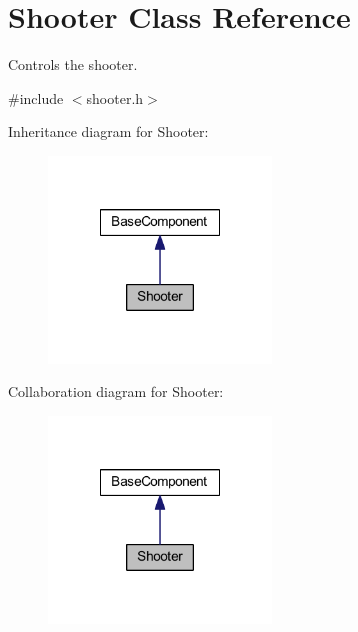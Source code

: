 \hypertarget{class_shooter}{\section{\-Shooter \-Class \-Reference}
\label{class_shooter}
}


\-Controls the shooter.  




{\ttfamily \#include $<$shooter.\-h$>$}



\-Inheritance diagram for \-Shooter\-:\nopagebreak
\begin{figure}[H]
\begin{center}
\leavevmode
\includegraphics[width=168pt]{class_shooter__inherit__graph}
\end{center}
\end{figure}


\-Collaboration diagram for \-Shooter\-:\nopagebreak
\begin{figure}[H]
\begin{center}
\leavevmode
\includegraphics[width=168pt]{class_shooter__coll__graph}
\end{center}
\end{figure}

